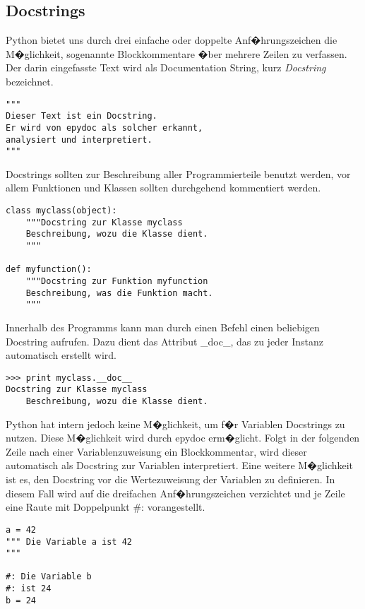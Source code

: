 \subsection*{Docstrings}
\label{documentation:sec:docstrings}

Python bietet uns durch drei einfache oder doppelte Anf�hrungszeichen die M�glichkeit, sogenannte Blockkommentare �ber mehrere Zeilen zu verfassen. Der darin eingefasste Text wird als Documentation String, kurz \textit{Docstring} bezeichnet. 

\begin{lstlisting}[label=documentation:lst:docstringbsp]
"""
Dieser Text ist ein Docstring.
Er wird von epydoc als solcher erkannt, 
analysiert und interpretiert.
"""
\end{lstlisting}

Docstrings sollten zur Beschreibung aller Programmierteile benutzt werden, vor allem Funktionen und Klassen sollten durchgehend kommentiert werden.

\begin{lstlisting}[label=documentation:lst:docstringbsp2]
class myclass(object): 
	"""Docstring zur Klasse myclass
	Beschreibung, wozu die Klasse dient.
	"""

def myfunction():
	"""Docstring zur Funktion myfunction
	Beschreibung, was die Funktion macht.
	"""
\end{lstlisting}

Innerhalb des Programms kann man durch einen Befehl einen beliebigen Docstring aufrufen. Dazu dient das Attribut _doc_, das zu jeder Instanz automatisch erstellt wird.

\begin{lstlisting}[label=documentation:lst:docstringausgeben]
>>> print myclass.__doc__
Docstring zur Klasse myclass
	Beschreibung, wozu die Klasse dient.
\end{lstlisting}


Python hat intern jedoch keine M�glichkeit, um f�r Variablen Docstrings zu nutzen. Diese M�glichkeit wird durch epydoc erm�glicht. Folgt in der folgenden Zeile nach einer Variablenzuweisung ein Blockkommentar, wird dieser automatisch als Docstring zur Variablen interpretiert. Eine weitere M�glichkeit ist es, den Docstring vor die Wertezuweisung der Variablen zu definieren. In diesem Fall wird auf die dreifachen Anf�hrungszeichen verzichtet und je Zeile eine Raute mit Doppelpunkt #: vorangestellt.

\begin{lstlisting}[label=documentation:lst:docstringepydoc]
a = 42
""" Die Variable a ist 42
"""

#: Die Variable b
#: ist 24
b = 24
\end{lstlisting}


